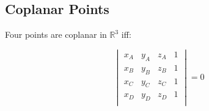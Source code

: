 \subsection{Coplanar Points}

Four points are coplanar in $\mathbb{R}^3$ iff:

$$ \begin{vmatrix}
x_A & y_A & z_A & 1 \\
x_B & y_B & z_B & 1 \\
x_C & y_C & z_C & 1 \\
x_D & y_D & z_D & 1 \\
\end{vmatrix}  = 0 $$
